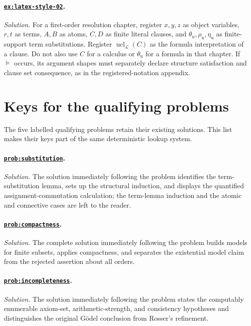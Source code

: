 \documentclass[11pt,oneside,openany]{book}
\theoremstyle{definition}
\theoremstyle{plain}
\theoremstyle{remark}
\newcommand{\Lang}{\mathcal{L}}
\newcommand{\entails}{\models}
\begin{document}
\paragraph{\hyperref[ex:latex-style-02]{\texttt{ex:latex-style-02}}.}
\textit{Solution.}  For a first-order resolution chapter, register
\(x,y,z\) as object variables, \(r,t\) as terms,
\(A,B\) as atoms, \(C,D\) as finite literal clauses, and
\(\theta_{\mathrm u},\rho_{\mathrm u},\eta_{\mathrm u}\) as finite-support
term substitutions.  Register \(\operatorname{ucl}_{\Lang}(C)\) as the formula
interpretation of a clause.  Do not also use \(C\) for a calculus or
\(\theta_{\mathrm u}\) for a formula in that chapter.  If \(\entails\) occurs,
its argument shapes must separately declare structure satisfaction and clause
set consequence, as in the registered-notation appendix.

\section{Keys for the qualifying problems}

The five labelled qualifying problems retain their existing solutions.  This
list makes their keys part of the same deterministic lookup system.

\paragraph{\hyperref[prob:substitution]{\texttt{prob:substitution}}.}
\textit{Solution.}  The solution immediately following the problem
identifies the term-substitution lemma, sets up the structural induction,
and displays the quantified assignment-commutation calculation; the
term-lemma induction and the atomic and connective cases are left to the
reader.

\paragraph{\hyperref[prob:compactness]{\texttt{prob:compactness}}.}
\textit{Solution.}  The complete solution immediately following the problem
builds models for finite subsets, applies compactness, and separates the
existential model claim from the rejected assertion about all orders.

\paragraph{\hyperref[prob:incompleteness]{\texttt{prob:incompleteness}}.}
\textit{Solution.}  The solution immediately following the problem states the
 computably enumerable axiom-set, arithmetic-strength, and consistency hypotheses and
distinguishes the original G\"odel conclusion from Rosser's refinement.
\end{document}
